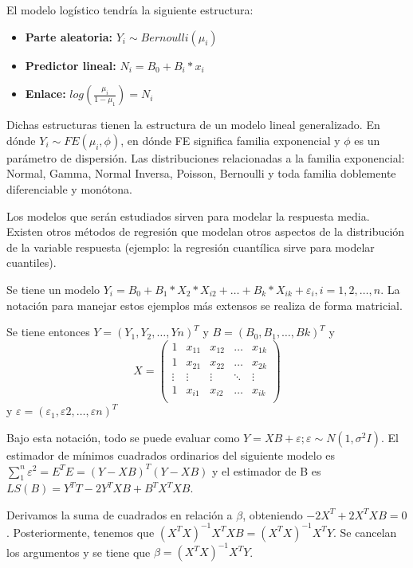 \documentclass{article}
\begin{document}
El modelo logístico tendría la siguiente estructura:

\begin{itemize}
	\item \textbf{Parte aleatoria:} $Y_{i}\sim  Bernoulli(\mu_{i})$
	\item \textbf{Predictor lineal:} $N_{i}=B_{0}+B_{i}*x_{i}$
	\item \textbf{Enlace:} $log(\frac{\mu_i}{1-\mu_{1}})=N_{i}$
\end{itemize}

Dichas estructuras tienen la estructura de un modelo lineal generalizado. En dónde $Y_{i}\sim FE(\mu_{i},\phi)$, en dónde FE significa familia exponencial y $\phi$ es un parámetro de dispersión. Las distribuciones relacionadas a la familia exponencial: Normal, Gamma, Normal Inversa, Poisson, Bernoulli y toda familia doblemente diferenciable y monótona.

Los modelos que serán estudiados sirven para modelar la respuesta media. Existen otros métodos de regresión que modelan otros aspectos de la distribución de la variable respuesta (ejemplo: la regresión cuantílica sirve para modelar cuantiles).

Se tiene un modelo $Y_{i}=B_{0}+B_{1}*X_{2}*X_{i2}+\ldots+B_{k}*X_{ik}+\varepsilon_{i}, i=1,2, \ldots ,n$.  La notación para manejar estos ejemplos más extensos se realiza de forma matricial.

Se tiene entonces $Y=(Y_{1},Y_{2},\ldots,Y{n})^{T}$ y $B=(B_{0},B_{1},\ldots,B{k})^{T}$ y
\[
X= 
\begin{pmatrix}
1 & x_{11} & x_{12} & \ldots & x_{1k} \\
1 & x_{21} & x_{22} & \ldots & x_{2k} \\
\vdots & \vdots & \vdots & \ddots & \vdots \\
1 & x_{i1} & x_{i2} & \ldots & x_{ik} \\
\end{pmatrix}
\]
y $\varepsilon=(\varepsilon_{1},\varepsilon{2},\ldots,\varepsilon{n})^{T}$

Bajo esta notación, todo se puede evaluar como $Y= XB + \varepsilon; \varepsilon\sim N(1,\sigma^{2}I)$. El estimador de mínimos cuadrados ordinarios del siguiente modelo es $\sum_{1}^{n} \varepsilon^{2}=E^{T}E=(Y-XB)^{T}(Y-XB)$ y el estimador de B es $LS(B)=Y^{T}T-2Y^{T}XB+B^{T}X^{T}XB$.

Derivamos la suma de cuadrados en relación a $\beta$, obteniendo $-2X^{T}+2X^{T}XB=0$. Posteriormente, tenemos que $(X^{T}X)^{-1}X^{T}XB=(X^{T}X)^{-1}X^{T}Y$. Se cancelan los argumentos y se tiene que $\beta=(X^{T}X)^{-1}X^{T}Y$.
\end{document}
